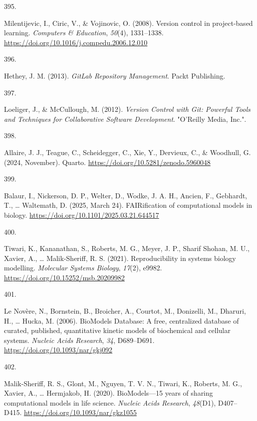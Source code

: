 \documentclass[
  11pt,
  letterpaper,
]{scrreprt}
\newlength{\cslhangindent}
\newlength{\csllabelwidth}
\newenvironment{CSLReferences}[2] %
 {\begin{list}{}{%
  \setlength{\itemindent}{0pt}
  \setlength{\leftmargin}{0pt}
  \setlength{\parsep}{0pt}
  \ifodd #1
   \setlength{\leftmargin}{\cslhangindent}
   \setlength{\itemindent}{-1\cslhangindent}
  \fi
  \setlength{\itemsep}{#2\baselineskip}}}
 {\end{list}}
\newcommand{\CSLLeftMargin}[1]{\parbox[t]{\csllabelwidth}{\strut#1\strut}}
\newcommand{\CSLRightInline}[1]{\parbox[t]{\linewidth - \csllabelwidth}{\strut#1\strut}}
\begin{document}
\begin{CSLReferences}{0}{0}
\CSLLeftMargin{395. }%
\CSLRightInline{Milentijevic, I., Ciric, V., \& Vojinovic, O. (2008).
Version control in project-based learning. \emph{Computers \&
Education}, \emph{50}(4), 1331--1338.
\url{https://doi.org/10.1016/j.compedu.2006.12.010}}

\CSLLeftMargin{396. }%
\CSLRightInline{Hethey, J. M. (2013). \emph{{GitLab Repository
Management}}. Packt Publishing.}

\CSLLeftMargin{397. }%
\CSLRightInline{Loeliger, J., \& McCullough, M. (2012). \emph{Version
{Control} with {Git}: {Powerful Tools} and {Techniques} for
{Collaborative Software Development}}. "O'Reilly Media, Inc.".}

\CSLLeftMargin{398. }%
\CSLRightInline{Allaire, J. J., Teague, C., Scheidegger, C., Xie, Y.,
Dervieux, C., \& Woodhull, G. (2024, November). Quarto.
\url{https://doi.org/10.5281/zenodo.5960048}}

\CSLLeftMargin{399. }%
\CSLRightInline{Balaur, I., Nickerson, D. P., Welter, D., Wodke, J. A.
H., Ancien, F., Gebhardt, T., \ldots{} Waltemath, D. (2025, March 24).
{FAIRification} of computational models in biology.
\url{https://doi.org/10.1101/2025.03.21.644517}}

\CSLLeftMargin{400. }%
\CSLRightInline{Tiwari, K., Kananathan, S., Roberts, M. G., Meyer, J.
P., Sharif Shohan, M. U., Xavier, A., \ldots{} Malik-Sheriff, R. S.
(2021). Reproducibility in systems biology modelling. \emph{Molecular
Systems Biology}, \emph{17}(2), e9982.
\url{https://doi.org/10.15252/msb.20209982}}

\CSLLeftMargin{401. }%
\CSLRightInline{Le Novère, N., Bornstein, B., Broicher, A., Courtot, M.,
Donizelli, M., Dharuri, H., \ldots{} Hucka, M. (2006). {BioModels
Database}: A free, centralized database of curated, published,
quantitative kinetic models of biochemical and cellular systems.
\emph{Nucleic Acids Research}, \emph{34}, D689--D691.
\url{https://doi.org/10.1093/nar/gkj092}}

\CSLLeftMargin{402. }%
\CSLRightInline{Malik-Sheriff, R. S., Glont, M., Nguyen, T. V. N.,
Tiwari, K., Roberts, M. G., Xavier, A., \ldots{} Hermjakob, H. (2020).
{BioModels}---15 years of sharing computational models in life science.
\emph{Nucleic Acids Research}, \emph{48}(D1), D407--D415.
\url{https://doi.org/10.1093/nar/gkz1055}}


\end{CSLReferences}
\end{document}
